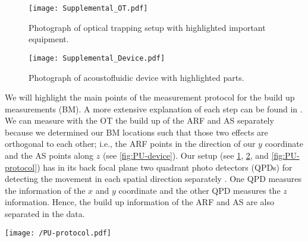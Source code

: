 \begin{figure}[tbp]
  \centering
  \texttt{[image: Supplemental\_OT.pdf]}
  \caption{Photograph of optical trapping setup with highlighted important 
  equipment.\label{fig:PU-app-OT}}
\end{figure}

\begin{figure}[tbp]
  \centering
  \texttt{[image: Supplemental\_Device.pdf]}
  \caption{Photograph of acoustofluidic device with highlighted parts. 
  \label{fig:PU-app-device}}
\end{figure}

We will highlight the main points of the measurement protocol for the build up 
measurements (BM). A more extensive explanation of each step can be found in 
\citeauthor{Goering2021} \cite{Goering2021}. We can measure with the OT the 
build up of the ARF and AS separately because we determined our BM locations 
such that those two effects are orthogonal to each other; i.e., the ARF points 
in the direction of our $y$ coordinate and the AS points along $z$ (see 
\cref{fig:PU-device}). Our setup (see \cref{fig:PU-app-OT}, 
\cref{fig:PU-app-device}, and \cref{fig:PU-protocol}) has in its back focal 
plane two quadrant photo detectors (QPDs) for detecting the movement in each 
spatial direction separately 
\cite{Lakaemper2015,Goering2021,Lamprecht2021,Lamprecht2016}. One QPD measures 
the information of the $x$ and $y$ coordinate and the other QPD measures the 
$z$ information. Hence, the build up information of the ARF and AS are also 
separated in the data.


\begin{figure*}[tbp]
  \centering
  \texttt{[image: /PU-protocol.pdf]}
  \caption{Schematic of optical trapping setup, laser settings ($P$: laser 
    power), and optical shutter settings ($T$: transmittance for $\llaser = 
    \SI{785}{\nm}$) before and after the build up measurement (BM; top) and 
    during the BM (bottom). During the BM the particle is free floating, the 
    laser power is reduced as low as possible, the shutter is opened to allow 
    optical position detection on the quadrant photo detectors (QPDs), and the 
    ultrasound is switched on; hence there acts an acoustic force 
  $F_{\mathrm{ac}}$ on the particle. Before and after the BM all states are 
switched to their respective opposite.}\label{fig:PU-protocol}
\end{figure*}

